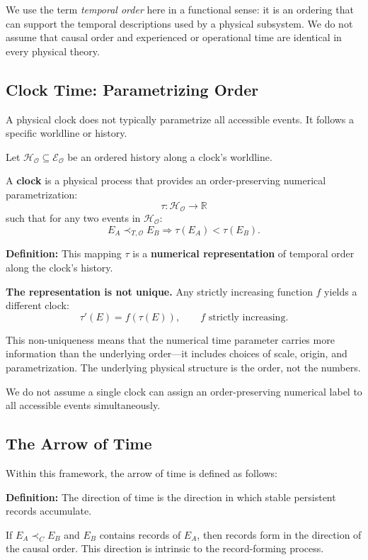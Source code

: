 \documentclass[12pt, a4paper]{article}
\begin{document}
We use the term \textit{temporal order} here in a functional sense: it is an ordering that can support the temporal descriptions used by a physical subsystem. We do not assume that causal order and experienced or operational time are identical in every physical theory.

\subsection{Clock Time: Parametrizing Order}

A physical clock does not typically parametrize all accessible events. It follows a specific worldline or history.

Let \( \mathcal H_{\mathcal O} \subseteq \mathcal E_{\mathcal O} \) be an ordered history along a clock's worldline.

A \textbf{clock} is a physical process that provides an order-preserving numerical parametrization:
\[
\tau: \mathcal H_{\mathcal O} \rightarrow \mathbb{R}
\]
such that for any two events in \( \mathcal H_{\mathcal O} \):
\[
E_A \prec_{T,\mathcal{O}} E_B \Rightarrow \tau(E_A) < \tau(E_B).
\]

\textbf{Definition:} This mapping \( \tau \) is a \textbf{numerical representation} of temporal order along the clock's history.

\textbf{The representation is not unique.} Any strictly increasing function \( f \) yields a different clock:
\[
\tau'(E) = f(\tau(E)), \qquad f \text{ strictly increasing}.
\]

This non-uniqueness means that the numerical time parameter carries more information than the underlying order---it includes choices of scale, origin, and parametrization. The underlying physical structure is the order, not the numbers.

We do not assume a single clock can assign an order-preserving numerical label to all accessible events simultaneously.

\subsection{The Arrow of Time}

Within this framework, the arrow of time is defined as follows:

\textbf{Definition:} The direction of time is the direction in which stable persistent records accumulate.

If \( E_A \prec_C E_B \) and \( E_B \) contains records of \( E_A \), then records form in the direction of the causal order. This direction is intrinsic to the record-forming process.
\end{document}
